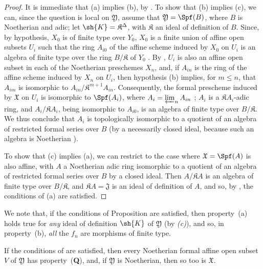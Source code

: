 \begin{proof}
It is immediate that (a) implies (b), by .
To show that (b) implies (c), we can, since the question is local on $\mathfrak{Y}$, assume that $\mathfrak{Y}=\Spf(B)$, where $B$ is Noetherian and adic;
let $\sh{K}=\mathfrak{K}^\Delta$, with $\mathfrak{K}$ an ideal of definition of $B$.
Since, by hypothesis, $X_0$ is of finite type over $Y_0$, $X_0$ is a finite union of affine open subsets $U_i$ such that the ring $A_{i0}$ of the affine scheme induced by $X_0$ on $U_i$ is an algebra of finite type over the ring $B/\mathfrak{K}$ of $Y_0$ .
By , $U_i$ is also an affine open subset in each of the Noetherian preschemes $X_n$, and, if $A_{in}$ is the ring of the affine scheme induced by $X_n$ on $U_i$, then hypothesis (b) implies, for $m\leq n$, that $A_{im}$ is isomorphic to $A_{in}/\mathfrak{K}^{m+1}A_{in}$.
Consequently, the formal prescheme induced by $\mathfrak{X}$ on $U_i$ is isomorphic to $\Spf(A_i)$, where $A_i=\varprojlim_n A_{in}$ ;
$A_i$ is a $\mathfrak{K}A_i$-adic ring, and $A_i/\mathfrak{K}A_i$, being isomorphic to $A_{i0}$, is an algebra of finite type over $B/\mathfrak{K}$.
We thus conclude  that $A_i$ is topologically isomorphic to a quotient of an algebra of restricted formal series over $B$ (by a necessarily closed ideal, because such an algebra is Noetherian ).

To show that (c) implies (a), we can restrict to the case where $\mathfrak{X}=\Spf(A)$ is also affine, with $A$ a Noetherian adic ring isomorphic to a quotient of an algebra of restricted formal series over $B$ by a closed ideal.
Then  $A/\mathfrak{K}A$ is an algebra of finite type over $B/\mathfrak{K}$, and $\mathfrak{K}A=\mathfrak{J}$ is an ideal of definition of $A$, and so, by , the conditions of (a) are satisfied.
\end{proof}

We note that, if the conditions of Proposition  are satisfied, then property~(a) holds true for \emph{any} ideal of definition $\sh{K}$ of $\mathfrak{Y}$ (by \emph{(c)}), and so, in property~(b), \emph{all} the $f_n$ are morphisms of finite type.

\begin{corollary}[10.13.2]
\label{I.10.13.2}
If the conditions of  are satisfied, then every Noetherian formal affine open subset $V$ of $\mathfrak{Y}$ has property~(\textbf{Q}), and, if $\mathfrak{Y}$ is Noetherian, then so too is $\mathfrak{X}$.
\end{corollary}


